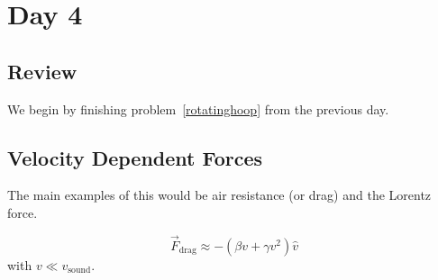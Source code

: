 \section{Day 4}

\subsection{Review}
We begin by finishing problem~\ref{rotatinghoop} from the previous day.

\subsection{Velocity Dependent Forces}
The main examples of this would be air resistance (or drag) and the
Lorentz force.

\[ \vec{F}_{\textrm{drag}} \approx -\left(\beta v + \gamma v^2\right)
\hat{v} \]
with $v \ll v_{\textrm{sound}}$.


